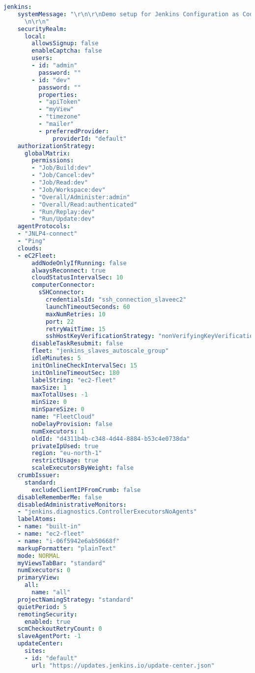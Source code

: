 \begin{lstlisting}[language=yaml, style=yamlstyle]
    jenkins:
    systemMessage: "\r\n\r\nDemo setup for Jenkins Configuration as Code plugin......\r\
      \n\r\n"
    securityRealm:
      local:
        allowsSignup: false
        enableCaptcha: false
        users:
        - id: "admin"
          password: ""
        - id: "dev"
          password: ""
          properties:
          - "apiToken"
          - "myView"
          - "timezone"
          - "mailer"
          - preferredProvider:
              providerId: "default"
    authorizationStrategy:
      globalMatrix:
        permissions:
        - "Job/Build:dev"
        - "Job/Cancel:dev"
        - "Job/Read:dev"
        - "Job/Workspace:dev"
        - "Overall/Administer:admin"
        - "Overall/Read:authenticated"
        - "Run/Replay:dev"
        - "Run/Update:dev"
    agentProtocols:
    - "JNLP4-connect"
    - "Ping"
    clouds:
    - eC2Fleet:
        addNodeOnlyIfRunning: false
        alwaysReconnect: true
        cloudStatusIntervalSec: 10
        computerConnector:
          sSHConnector:
            credentialsId: "ssh_connection_slaveec2"
            launchTimeoutSeconds: 60
            maxNumRetries: 10
            port: 22
            retryWaitTime: 15
            sshHostKeyVerificationStrategy: "nonVerifyingKeyVerificationStrategy"
        disableTaskResubmit: false
        fleet: "jenkins_slaves_autoscale_group"
        idleMinutes: 5
        initOnlineCheckIntervalSec: 15
        initOnlineTimeoutSec: 180
        labelString: "ec2-fleet"
        maxSize: 1
        maxTotalUses: -1
        minSize: 0
        minSpareSize: 0
        name: "FleetCloud"
        noDelayProvision: false
        numExecutors: 1
        oldId: "d4311b4b-c348-4d44-8884-b53c4e0738da"
        privateIpUsed: true
        region: "eu-north-1"
        restrictUsage: true
        scaleExecutorsByWeight: false
    crumbIssuer:
      standard:
        excludeClientIPFromCrumb: false
    disableRememberMe: false
    disabledAdministrativeMonitors:
    - "jenkins.diagnostics.ControllerExecutorsNoAgents"
    labelAtoms:
    - name: "built-in"
    - name: "ec2-fleet"
    - name: "i-06f5942e6ab50668f"
    markupFormatter: "plainText"
    mode: NORMAL
    myViewsTabBar: "standard"
    numExecutors: 0
    primaryView:
      all:
        name: "all"
    projectNamingStrategy: "standard"
    quietPeriod: 5
    remotingSecurity:
      enabled: true
    scmCheckoutRetryCount: 0
    slaveAgentPort: -1
    updateCenter:
      sites:
      - id: "default"
        url: "https://updates.jenkins.io/update-center.json"

\end{lstlisting}
